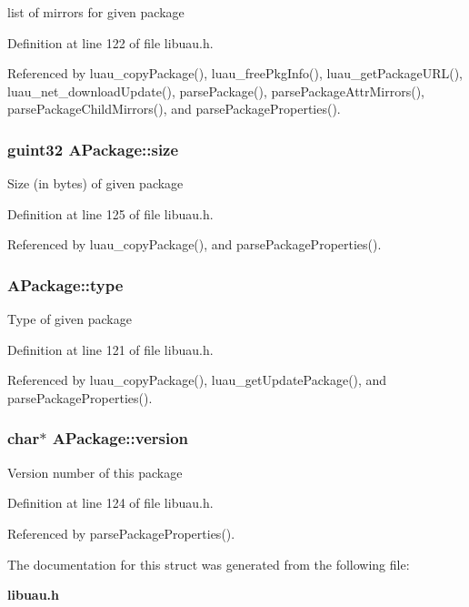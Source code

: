 list of mirrors for given package 

Definition at line 122 of file libuau.h.

Referenced by luau\_\-copy\-Package(), luau\_\-free\-Pkg\-Info(), luau\_\-get\-Package\-URL(), luau\_\-net\_\-download\-Update(), parse\-Package(), parse\-Package\-Attr\-Mirrors(), parse\-Package\-Child\-Mirrors(), and parse\-Package\-Properties().
\subsubsection{\setlength{\rightskip}{0pt plus 5cm}guint32 {\bf APackage::size}}\label{structAPackage_o4}


Size (in bytes) of given package 

Definition at line 125 of file libuau.h.

Referenced by luau\_\-copy\-Package(), and parse\-Package\-Properties().
\subsubsection{ {\bf APackage::type}}\label{structAPackage_o0}


Type of given package 

Definition at line 121 of file libuau.h.

Referenced by luau\_\-copy\-Package(), luau\_\-get\-Update\-Package(), and parse\-Package\-Properties().
\subsubsection{\setlength{\rightskip}{0pt plus 5cm}char$\ast$ {\bf APackage::version}}\label{structAPackage_o3}


Version number of this package 

Definition at line 124 of file libuau.h.

Referenced by parse\-Package\-Properties().

The documentation for this struct was generated from the following file:\begin{CompactItemize}
\item 
{\bf libuau.h}\end{CompactItemize}
